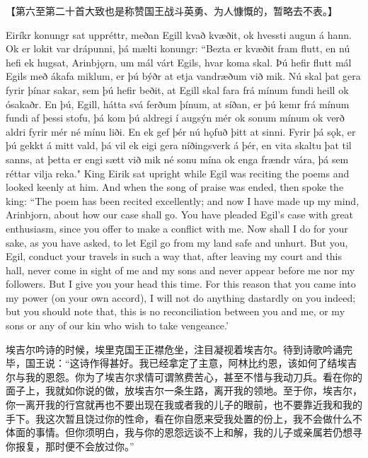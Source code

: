 \medskip
【第六至第二十首大致也是称赞国王战斗英勇、为人慷慨的，暂略去不表。】
\medskip
\begin{paracol}{2}
    Eiríkr konungr sat uppréttr, meðan Egill kvað kvæðit, ok hvessti augun á hann. Ok er lokit var drápunni, þá mælti konungr: ``Bezta er kvæðit fram flutt, en nú hefi ek hugsat, Arinbjǫrn, um mál várt Egils, hvar koma skal. Þú hefir flutt mál Egils með ákafa miklum, er þú býðr at etja vandræðum við mik. Nú skal þat gera fyrir þínar sakar, sem þú hefir beðit, at Egill skal fara frá mínum fundi heill ok ósakaðr. En þú, Egill, hátta svá ferðum þínum, at síðan, er þú kemr frá mínum fundi af þessi stofu, þá kom þú aldregi í augsýn mér ok sonum mínum ok verð aldri fyrir mér né mínu liði. En ek gef þér nú hǫfuð þitt at sinni. Fyrir þá sǫk, er þú gekkt á mitt vald, þá vil ek eigi gera níðingsverk á þér, en vita skaltu þat til sanns, at þetta er engi sætt við mik né sonu mína ok enga frændr vára, þá sem réttar vilja reka."
    \switchcolumn
    King Eirik sat upright while Egil was reciting the poems and looked keenly at him. And when the song of praise was ended, then spoke the king: ``The poem has been recited excellently; and now I have made up my mind, Arinbjorn, about how our case shall go. You have pleaded Egil's case with great enthusiasm, since you offer to make a conflict with me. Now shall I do for your sake, as you have asked, to let Egil go from my land safe and unhurt. But you, Egil, conduct your travels in such a way that, after leaving my court and this hall, never come in sight of me and my sons and never appear before me nor my followers. But I give you your head this time. For this reason that you came into my power (on your own accord), I will not do anything dastardly on you indeed; but you should note that, this is no reconciliation between you and me, or my sons or any of our kin who wish to take vengeance.'
\end{paracol}
\begin{translation*}{}
    埃吉尔吟诗的时候，埃里克国王正襟危坐，注目凝视着埃吉尔。待到诗歌吟诵完毕，国王说：“这诗作得甚好。我已经拿定了主意，阿林比约恩，该如何了结埃吉尔与我的恩怨。你为了埃吉尔求情可谓煞费苦心，甚至不惜与我动刀兵。看在你的面子上，我就如你说的做，放埃吉尔一条生路，离开我的领地。至于你，埃吉尔，你一离开我的行宫就再也不要出现在我或者我的儿子的眼前，也不要靠近我和我的手下。我这次暂且饶过你的性命，看在你自愿来受我处置的份上，我不会做什么不体面的事情。但你须明白，我与你的恩怨远谈不上和解，我的儿子或亲属若仍想寻你报复，那时便不会放过你。”
\end{translation*}
